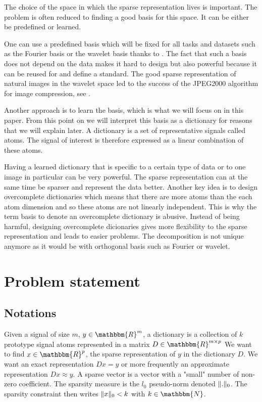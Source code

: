 \documentclass[a4paper,11pt]{article}
\newcommand{\RR}{\mathbbm{R}} %
\DeclarePairedDelimiter\norm{\lVert}{\rVert} %
\begin{document}
The choice of the space in which the sparse representation lives is important.
The problem is often reduced to finding a good basis for this space.
It can be either be predefined or learned.

One can use a predefined basis which will be fixed for all tasks and datasets such as the Fourier basis or the wavelet basis thanks to \cite{mallat1999}.
The fact that such a basis does not depend on the data makes it hard to design but also powerful because it can be reused for and define a standard.
The good sparse representation of natural images in the wavelet space led to the success of the JPEG2000 algorithm for image compression, see \cite{marcellin00}.

Another approach is to learn the basis, which is what we will focus on in this paper.
From this point on we will interpret this basis as a dictionary for reasons that we will explain later.
A dictionary is a set of representative signals called atoms.
The signal of interest is therefore expressed as a linear combination of these atoms.

Having a learned dictionary that is specific to a certain type of data or to one image in particular can be very powerful.
The sparse representation can at the same time be sparser and represent the data better.
Another key idea is to design overcomplete dictionaries which means that there are more atoms than the each atom dimension and so these atoms are not linearly independent.
This is why the term basis to denote an overcomplete dictionary is abusive.
Instead of being harmful, designing overcomplete dicionaries gives more flexibility to the sparse representation and leads to easier problems.
The decomposition is not unique anymore as it would be with orthogonal basis such as Fourier or wavelet.


\section{Problem statement}
\subsection{Notations}
Given a signal of size $m$, \textbf{$y \in \RR^m$}, a dictionary is a collection of $k$ prototype signal atoms represented in a matrix $D \in \RR^{m \times p}$
We want to find $x \in \RR^p$, the sparse representation of $y$ in the dictionary $D$.
We want an exact representation $D x = y$ or more frequently an approximate representation $ D x \approx y$.
A sparse vector is a vector with a "small" number of non-zero coefficient.
The sparsity measure is the $l_0$ pseudo-norm denoted $\norm{.}_0$.
The sparsity constraint then writes $\norm{x}_0<k$ with $k \in \mathbbm{N}$.
\end{document}

